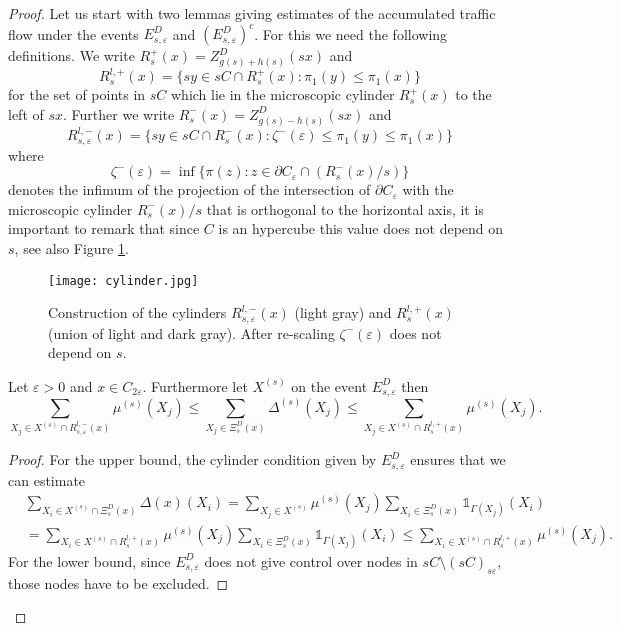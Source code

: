 \begin{proof}
Let us start with two lemmas giving estimates of the accumulated traffic flow under the events $E^D_{s,\varepsilon}$ and $(E^D_{s,\varepsilon})^c$. For this we need the following definitions. We write $R^+_s(x)=Z^D_{g(s)+h(s)}(sx)$ and $$R^{l,+}_s(x)=\lbrace sy\in sC\cap R^+_s(x): \pi_1(y)\leq\pi_1(x)\rbrace $$ for the set of points in $sC$ which lie in the microscopic cylinder $R^+_s(x)$ to the left of $sx$. Further we write $R^-_s(x)=Z^D_{g(s)-h(s)}(sx)$ and $$R^{l,-}_{s,\varepsilon}(x)=\lbrace sy\in sC\cap R^-_s(x): \zeta^-(\varepsilon)\leq\pi_1(y)\leq\pi_1(x)\rbrace $$ where $$\zeta^-(\varepsilon)=\inf\lbrace\pi(z):z\in\partial C_{\varepsilon}\cap (R^-_s(x)/s)\rbrace$$ denotes the infimum of the projection of the intersection of $\partial C_{\varepsilon}$ with the microscopic cylinder $R^-_s(x)/s$ that is orthogonal to the horizontal axis, it is important to remark that since $C$ is an hypercube this value does not depend  on $s$, see also Figure \ref{fig.2.3}. 
\begin{figure}
\captionsetup{width=1\textwidth}
\centering
\texttt{[image: cylinder.jpg]}
\caption{Construction of the cylinders $R^{l,-}_{s,\varepsilon}(x)$ (light gray) and $R^{l,+}_s(x)$ (union of light and dark gray). After re-scaling $\zeta^-(\varepsilon)$ does not depend on $s$.}
\label{fig.2.3}
\end{figure}
 \begin{lem}\label{lem2.1}
Let $\varepsilon>0$ and $x\in C_{2\varepsilon}$. Furthermore let $X^{(s)}$ on the event $E_{s,\varepsilon}^D$ then
 $$\sum_{X_j\in X^{(s)}\cap R^{l,-}_{s,\varepsilon}(x)}\mu^{(s)}(X_j)\leq\sum_{X_j\in  \Xi^{D}_{s}(x)}\Delta^{(s)}(X_j)\leq\sum_{X_j\in X^{(s)}\cap R^{l,+}_{s}(x)}\mu^{(s)}(X_j).$$
 \end{lem}
 \begin{proof}
For the upper bound, the cylinder condition given by $E^D_{s,\varepsilon}$ ensures that we can estimate
\begin{align}
&\sum_{X_i\in X^{(s)}\cap \Xi^D_s(x)}\Delta (x)(X_i)=\sum_{X_j\in X^{(s)}}\mu^{(s)}(X_j)\sum_{X_i\in \Xi^D_s(x)}\mathds{1}_{\Gamma(X_j)}(X_i)\nonumber\\
&=\sum_{X_i\in X^{(s)}\cap R_{s}^{l,+}(x)}\mu^{(s)}(X_j)\sum_{X_i\in \Xi^D_s(x)}\mathds{1}_{\Gamma(X_j)}(X_i)\leq \sum_{X_i\in X^{(s)}\cap R_{s}^{l,+}(x)}\mu^{(s)}(X_j).\nonumber
\end{align}
For the lower bound, since $E^D_{s,\varepsilon}$ does not give control over nodes in $sC\setminus (sC)_{s\varepsilon}$, those nodes have to be excluded.


\end{proof}
\end{proof}
